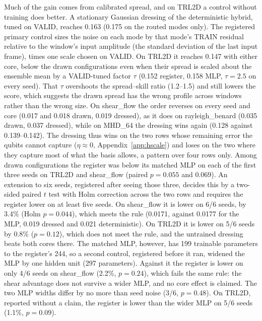\documentclass{article}
\begin{document}
Much of the gain comes from calibrated spread, and on TRL2D a control without training does better. A stationary
Gaussian dressing of the deterministic hybrid, tuned on VALID, reaches 0.163 (0.175 on the routed modes only). The
registered primary control sizes the noise on each mode by that mode's TRAIN residual relative to the window's input
amplitude (the standard deviation of the last input frame), times one scale chosen on VALID. On TRL2D it reaches 0.147
with either core, below the drawn configurations even when their spread is scaled about the ensemble mean by a
VALID-tuned factor $\tau$ (0.152 register, 0.158 MLP, $\tau=2.5$ on every seed). That $\tau$ overshoots the
spread--skill ratio (1.2--1.5) and still lowers the score, which suggests the drawn spread has the wrong profile across
windows rather than the wrong size. On shear\_flow the order reverses on every seed and core (0.017 and 0.018 drawn,
0.019 dressed), as it does on rayleigh\_benard (0.035 drawn, 0.037 dressed), while on MHD\_64 the dressing wins again
(0.128 against 0.139--0.142). The dressing thus wins on the two rows whose remaining error the qubits cannot capture
($\eta\approx 0$, Appendix~\ref{app:hscale}) and loses on the two where they capture most of what the basis allows, a
pattern over four rows only.
Among drawn configurations the register was below its matched MLP on each of the first three seeds on TRL2D and
shear\_flow (paired $p=0.055$ and $0.069$). An extension to six seeds, registered after seeing those three, decides this
by a two-sided paired $t$ test with Holm correction across the two rows and requires the register lower on at least five
seeds. On shear\_flow it is lower on 6/6 seeds, by 3.4\% (Holm $p=0.044$), which meets the rule (0.0171, against 0.0177
for the MLP, 0.019 dressed and 0.021 deterministic). On TRL2D it is lower on 5/6 seeds by 0.8\% ($p=0.12$), which does not
meet the rule, and the untrained dressing beats both cores there. The matched MLP, however, has 199 trainable parameters
to the register's 244, so a second control, registered before it ran, widened the MLP by one hidden unit (297
parameters). Against it the register is lower on only 4/6 seeds on shear\_flow (2.2\%, $p=0.24$), which fails the same
rule: the shear advantage does not survive a wider MLP, and no core effect is claimed. The two MLP widths differ by no
more than seed noise (3/6, $p=0.48$). On TRL2D, reported without a claim, the register is lower than the wider MLP on 5/6
seeds (1.1\%, $p=0.09$).

\begin{table}[h]
\centering
\caption{Distribution of configurations per input (30 qubits, TEST, mean over seeds). ES / det.: energy score over the
deterministic hybrid's VRMSE, same core and seeds. Last two columns (seeds in brackets): the energy score with the
spread scaled by the VALID-tuned $\tau$, and the window-scaled Gaussian dressing of the deterministic hybrid.}
\label{tab:fgn}
\small
{}
\end{table}
\end{document}

